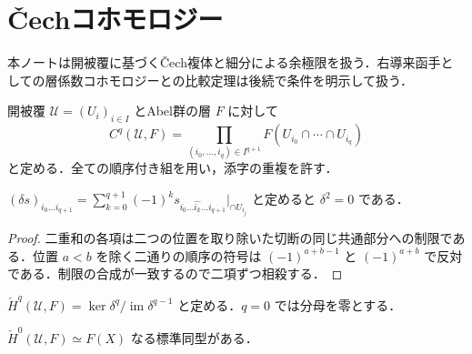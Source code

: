 \section{Čechコホモロジー}
本ノートは開被覆に基づくČech複体と細分による余極限を扱う．右導来函手としての層係数コホモロジーとの比較定理は後続で条件を明示して扱う．
\begin{defn}[Čech余鎖群]
開被覆 $\mathcal U=(U_i)_{i\in I}$ とAbel群の層 $F$ に対して
\[
 C^q(\mathcal U,F)=\prod_{(i_0,\ldots,i_q)\in I^{q+1}}F(U_{i_0}\cap\cdots\cap U_{i_q})
\]
と定める．全ての順序付き組を用い，添字の重複を許す．
\end{defn}
\begin{prop}[Čech微分]
$(\delta s)_{i_0\ldots i_{q+1}}=\sum_{k=0}^{q+1}(-1)^k s_{i_0\ldots\widehat{i_k}\ldots i_{q+1}}|_{\cap U_{i_j}}$ と定めると $\delta^2=0$ である．
\end{prop}
\begin{proof}
二重和の各項は二つの位置を取り除いた切断の同じ共通部分への制限である．位置 $a<b$ を除く二通りの順序の符号は $(-1)^{a+b-1}$ と $(-1)^{a+b}$ で反対である．制限の合成が一致するので二項ずつ相殺する．
\end{proof}
\begin{defn}[被覆のČechコホモロジー]
$\check H^q(\mathcal U,F)=\ker\delta^q/\operatorname{im}\delta^{q-1}$ と定める．$q=0$ では分母を零とする．
\end{defn}
\begin{prop}[零次Čechコホモロジー]
$\check H^0(\mathcal U,F)\simeq F(X)$ なる標準同型がある．
\end{prop}
